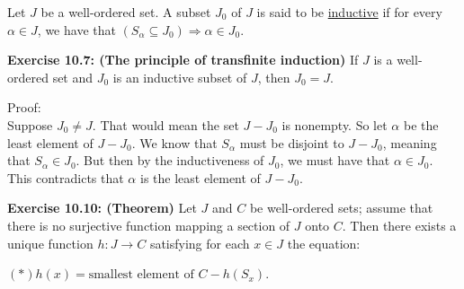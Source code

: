 \documentclass{book}
\newcommand{\hOne}{%
   \color{Black}%
   \fontsize{14}{16}\selectfont%
}
\newcommand{\exOne}{%
   \color{Purple}%
   \fontsize{14}{16}\selectfont%
}
\newcommand{\exTwo}{%
\color{Purple}%
   \fontsize{13}{15}\selectfont%
}
\newenvironment{myIndent}{%
   \begin{adjustwidth}{2.5em}{0em}%
}{%
   \end{adjustwidth}%
}
\newcommand{\udefine}[1]{{%
   \setulcolor{Red}%
   \setul{0.14em}{0.07em}%
   \ul{#1}%
}}
\newcommand{\blab}[1]{\textbf{#1}}
\newcommand{\retTwo}{\hfill\bigbreak}
\begin{document}
   \hOne
   Let $J$ be a well-ordered set. A subset $J_0$ of $J$ is said to be \udefine{inductive} if for every $\alpha \in J$, we have that $(S_\alpha \subseteq J_0) \Longrightarrow \alpha \in J_0$.\retTwo

   \exOne\blab{Exercise 10.7: (The principle of transfinite induction)} If $J$ is a well-ordered set and $J_0$ is an inductive subset of $J$, then $J_0 = J$.
   
   \begin{myIndent}\exTwo
      Proof:\\
      Suppose $J_0 \neq J$. That would mean the set $J - J_0$ is nonempty. So let $\alpha$ be the least element of $J - J_0$. We know that $S_\alpha$ must be disjoint to $J - J_0$, meaning that $S_\alpha \in J_0$. But then by the inductiveness of $J_0$, we must have that $\alpha \in J_0$. This contradicts that $\alpha$ is the least element of $J - J_0$.\retTwo\retTwo
   \end{myIndent}

   \blab{Exercise 10.10: (Theorem)} Let $J$ and $C$ be well-ordered sets; assume that there is no surjective function mapping a section of $J$ onto $C$. Then there exists a unique function $h: J \longrightarrow C$ satisfying for each $x \in J$ the equation:\\ [-14pt]
   
   {\centering $(*)$\phantom{aaaaaaaaaaaaaa}$h(x) = \text{smallest element of } C - h(S_x)$.\retTwo\par}
\end{document}
